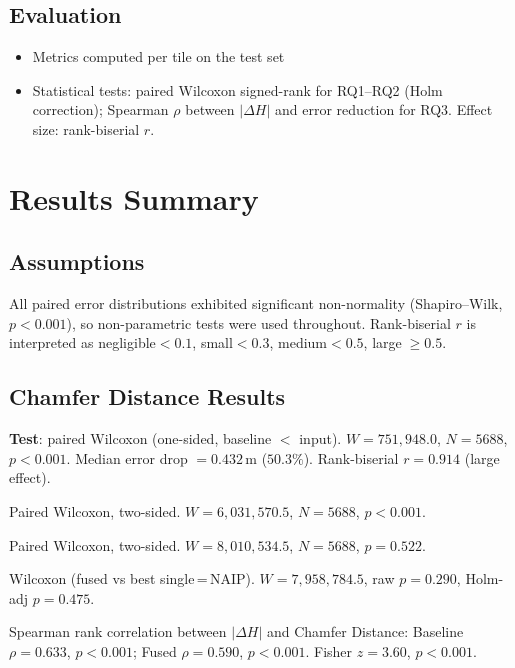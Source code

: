 \documentclass[preprint,12pt,authoryear]{elsarticle}
\begin{document}
\subsection{Evaluation}
\begin{itemize}[leftmargin=*]
    \item Metrics computed per tile on the test set
    \item Statistical tests: paired Wilcoxon signed-rank for RQ1–RQ2 (Holm correction); Spearman $\rho$ between $|\Delta H|$ and error reduction for RQ3. Effect size: rank-biserial $r$.
\end{itemize}



\section*{Results Summary}

\subsection*{Assumptions}
All paired error distributions exhibited significant non-normality (Shapiro--Wilk, $p<0.001$), so non-parametric tests were used throughout. Rank-biserial $r$ is interpreted as {\small negligible\;$<0.1$}, {\small small\;$<0.3$}, {\small medium\;$<0.5$}, {\small large$\;\ge0.5$}.

\subsection{Chamfer Distance Results}
{\bfseries Test}: paired Wilcoxon (one-sided, baseline $<$ input).  
$W=751,948.0$, $N=5688$, $p<0.001$.  Median error drop $=0.432\,\text{m}$ ($50.3\%$).  
Rank-biserial $r=0.914$ (large effect).

Paired Wilcoxon, two-sided.  $W=6,031,570.5$, $N=5688$, $p<0.001$.  

Paired Wilcoxon, two-sided.  $W=8,010,534.5$, $N=5688$, $p=0.522$.  

Wilcoxon (fused vs best single\,=\,NAIP).  $W=7,958,784.5$, raw $p=0.290$, Holm-adj $p=0.475$.  

Spearman rank correlation between $|\Delta H|$ and Chamfer Distance:  
Baseline $\rho=0.633$, $p<0.001$; Fused $\rho=0.590$, $p<0.001$.  
Fisher $z=3.60$, $p<0.001$.  
\end{document}
